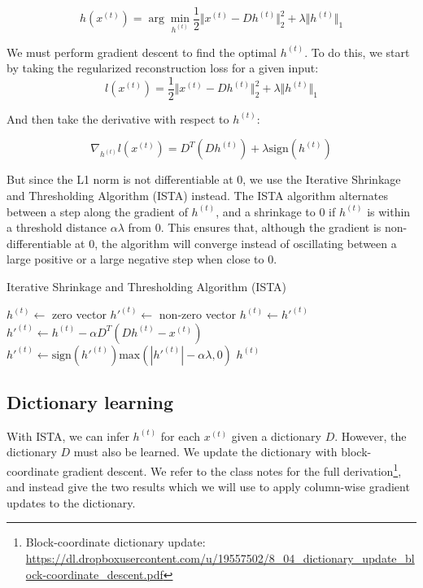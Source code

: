 \documentclass{article} %
\begin{document}
\begin{equation}
h(x^{(t)}) = \arg\min_{h^{(t)}} \frac{1}{2} \Vert x^{(t)} - D h^{(t)} \Vert_{2}^{2} + \lambda \Vert h^{(t)} \Vert_{1}
\end{equation}

We must perform gradient descent to find the optimal $h^{(t)}$. To do this, we start by taking the regularized reconstruction loss for a given input:
\begin{equation}
l(x^{(t)}) = \frac{1}{2} \Vert x^{(t)} - D h^{(t)} \Vert_{2}^{2} + \lambda \Vert h^{(t)} \Vert_{1}
\end{equation}

And then take the derivative with respect to $h^{(t)}$:

\begin{equation}
\nabla_{h^{(t)}} l (x^{(t)}) = D^T(D h^{(t)}) + \lambda \text{sign} (h^{(t)})
\end{equation}

But since the L1 norm is not differentiable at 0, we use the Iterative Shrinkage and Thresholding Algorithm (ISTA) instead. The ISTA algorithm alternates between a step along the gradient of $h^{(t)}$, and a shrinkage to $0$ if $h^{(t)}$ is within a threshold distance $\alpha\lambda$ from $0$. This ensures that, although the gradient is non-differentiable at 0, the algorithm will converge instead of oscillating between a large positive or a large negative step when close to $0$.

\begin{algorithm}
\caption{Iterative Shrinkage and Thresholding Algorithm (ISTA)}
\begin{algorithmic}[1]
\State $h^{(t)}\gets $ zero vector
\State $h'^{(t)}\gets $ non-zero vector 
	\State $h^{(t)}\gets h'^{(t)}$
	\State $h'^{(t)}\gets h^{(t)} - \alpha D^T(Dh^{(t)} - x^{(t)})$ 
	\State $h'^{(t)}\gets \text{sign}(h'^{(t)}) \text{max}(|h'^{(t)}| - \alpha\lambda, 0)$ 
\EndWhile
\State\Return $h^{(t)}$
\end{algorithmic}
\end{algorithm}

\subsection{Dictionary learning}
With ISTA, we can infer $h^{(t)}$ for each $x^{(t)}$ given a dictionary $D$. However, the dictionary $D$ must also be learned. We update the dictionary with block-coordinate gradient descent. We refer to the class notes for the full derivation\footnote{Block-coordinate dictionary update: \url{https://dl.dropboxusercontent.com/u/19557502/8_04_dictionary_update_block-coordinate_descent.pdf}}, and instead give the two results which we will use to apply column-wise gradient updates to the dictionary.
\end{document}
